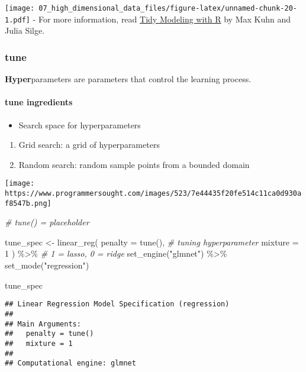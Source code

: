\documentclass[
]{book}
\newenvironment{Shaded}{\begin{snugshade}}{\end{snugshade}}
\newcommand{\AttributeTok}[1]{\textcolor[rgb]{0.77,0.63,0.00}{#1}}
\newcommand{\CommentTok}[1]{\textcolor[rgb]{0.56,0.35,0.01}{\textit{#1}}}
\newcommand{\DecValTok}[1]{\textcolor[rgb]{0.00,0.00,0.81}{#1}}
\newcommand{\FunctionTok}[1]{\textcolor[rgb]{0.00,0.00,0.00}{#1}}
\newcommand{\NormalTok}[1]{#1}
\newcommand{\OtherTok}[1]{\textcolor[rgb]{0.56,0.35,0.01}{#1}}
\newcommand{\SpecialCharTok}[1]{\textcolor[rgb]{0.00,0.00,0.00}{#1}}
\newcommand{\StringTok}[1]{\textcolor[rgb]{0.31,0.60,0.02}{#1}}
\providecommand{\tightlist}{%
  \setlength{\itemsep}{0pt}\setlength{\parskip}{0pt}}
\begin{document}
\texttt{[image: 07\_high\_dimensional\_data\_files/figure-latex/unnamed-chunk-20-1.pdf]}
- For more information, read \href{https://www.tmwr.org/}{Tidy Modeling with R} by Max Kuhn and Julia Silge.

\hypertarget{tune}{%
\subsubsection{tune}\label{tune}}

\textbf{Hyper}parameters are parameters that control the learning process.

\hypertarget{tune-ingredients}{%
\paragraph{tune ingredients}\label{tune-ingredients}}

\begin{itemize}
\tightlist
\item
  Search space for hyperparameters
\end{itemize}

\begin{enumerate}
\def\labelenumi{\arabic{enumi}.}
\item
  Grid search: a grid of hyperparameters
\item
  Random search: random sample points from a bounded domain
\end{enumerate}

\texttt{[image: https://www.programmersought.com/images/523/7e44435f20fe514c11ca0d930af8547b.png]}

\begin{Shaded}
\begin{Highlighting}[]
\CommentTok{\# tune() = placeholder}

\NormalTok{tune\_spec }\OtherTok{\textless{}{-}} \FunctionTok{linear\_reg}\NormalTok{(}
  \AttributeTok{penalty =} \FunctionTok{tune}\NormalTok{(), }\CommentTok{\# tuning hyperparameter}
  \AttributeTok{mixture =} \DecValTok{1}
\NormalTok{) }\SpecialCharTok{\%\textgreater{}\%} \CommentTok{\# 1 = lasso, 0 = ridge}
  \FunctionTok{set\_engine}\NormalTok{(}\StringTok{"glmnet"}\NormalTok{) }\SpecialCharTok{\%\textgreater{}\%}
  \FunctionTok{set\_mode}\NormalTok{(}\StringTok{"regression"}\NormalTok{)}

\NormalTok{tune\_spec}
\end{Highlighting}
\end{Shaded}

\begin{verbatim}
## Linear Regression Model Specification (regression)
## 
## Main Arguments:
##   penalty = tune()
##   mixture = 1
## 
## Computational engine: glmnet
\end{verbatim}
\end{document}
